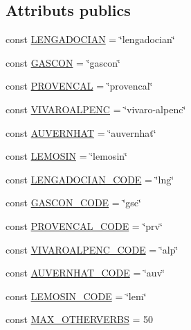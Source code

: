 \subsection*{Attributs publics}
\begin{DoxyCompactItemize}
\item 
const \hyperlink{class_conjugation_manager_base_aa525010174d498dcf8d808cd3260ec02}{L\+E\+N\+G\+A\+D\+O\+C\+I\+AN} = \char`\"{}lengadocian\char`\"{}
\item 
const \hyperlink{class_conjugation_manager_base_ab9472d32ede192022beef2300600bc63}{G\+A\+S\+C\+ON} = \char`\"{}gascon\char`\"{}
\item 
const \hyperlink{class_conjugation_manager_base_aafca1739a737b1e773d6b0d9a06a550f}{P\+R\+O\+V\+E\+N\+C\+AL} = \char`\"{}provencal\char`\"{}
\item 
const \hyperlink{class_conjugation_manager_base_af9c28ee0bf06bbf9817d3fc45fc0cc9f}{V\+I\+V\+A\+R\+O\+A\+L\+P\+E\+NC} = \char`\"{}vivaro-\/alpenc\char`\"{}
\item 
const \hyperlink{class_conjugation_manager_base_ad7b0a080735256224a1bb452ba945075}{A\+U\+V\+E\+R\+N\+H\+AT} = \char`\"{}auvernhat\char`\"{}
\item 
const \hyperlink{class_conjugation_manager_base_af5089c053a0abbb1d3c9ec9101f51523}{L\+E\+M\+O\+S\+IN} = \char`\"{}lemosin\char`\"{}
\item 
const \hyperlink{class_conjugation_manager_base_a4553efa71470b7eeed6ee2990c401b79}{L\+E\+N\+G\+A\+D\+O\+C\+I\+A\+N\+\_\+\+C\+O\+DE} = \char`\"{}lng\char`\"{}
\item 
const \hyperlink{class_conjugation_manager_base_aa94d935cbf435467c8cfaec38d6a6726}{G\+A\+S\+C\+O\+N\+\_\+\+C\+O\+DE} = \char`\"{}gsc\char`\"{}
\item 
const \hyperlink{class_conjugation_manager_base_a9dfc042d349e57819659d964c2870135}{P\+R\+O\+V\+E\+N\+C\+A\+L\+\_\+\+C\+O\+DE} = \char`\"{}prv\char`\"{}
\item 
const \hyperlink{class_conjugation_manager_base_a73f34b8b178aa35bcc8d35515e44d306}{V\+I\+V\+A\+R\+O\+A\+L\+P\+E\+N\+C\+\_\+\+C\+O\+DE} = \char`\"{}alp\char`\"{}
\item 
const \hyperlink{class_conjugation_manager_base_ac915776393fb88313fc9594acabc5c0e}{A\+U\+V\+E\+R\+N\+H\+A\+T\+\_\+\+C\+O\+DE} = \char`\"{}auv\char`\"{}
\item 
const \hyperlink{class_conjugation_manager_base_ab0a3fa2a7d3193603810cf5bed0a43b4}{L\+E\+M\+O\+S\+I\+N\+\_\+\+C\+O\+DE} = \char`\"{}lem\char`\"{}
\item 
const \hyperlink{class_conjugation_manager_base_acccc3a065b6c4c237da9519ee533e698}{M\+A\+X\+\_\+\+O\+T\+H\+E\+R\+V\+E\+R\+BS} = 50
\end{DoxyCompactItemize}
